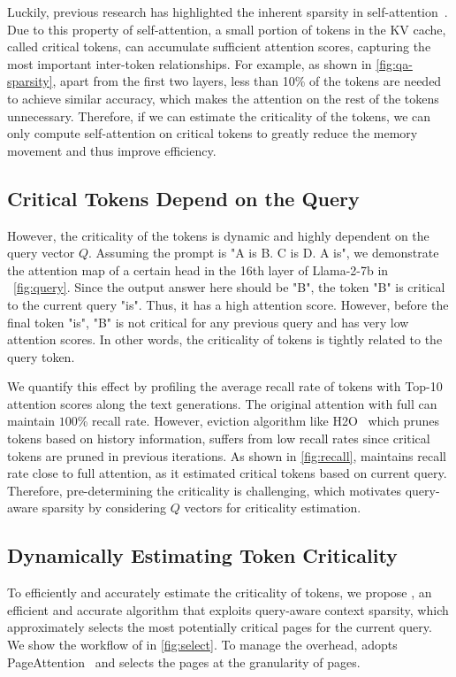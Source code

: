 Luckily, previous research has highlighted the inherent sparsity in self-attention~\cite{zhang2023h2o, ge2024model}. Due to this property of self-attention, a small portion of tokens in the KV cache, called critical tokens, can accumulate sufficient attention scores, capturing the most important inter-token relationships.
For example, as shown in \fig\ref{fig:qa-sparsity}, apart from the first two layers, less than 10\% of the tokens are needed to achieve similar accuracy, which makes the attention on the rest of the tokens unnecessary. 
Therefore, if we can estimate the criticality of the tokens, we can only compute self-attention on critical \kvc{} tokens to greatly reduce the memory movement and thus improve efficiency.

\subsection{Critical Tokens Depend on the Query}
However, the criticality of the tokens is dynamic and highly dependent on the query vector $Q$. Assuming the prompt is "A is B. C is D. A is", we demonstrate the attention map of a certain head in the 16th layer of Llama-2-7b in \fig~\ref{fig:query}. Since the output answer here should be "B", the token "B" is critical to the current query "is". Thus, it has a high attention score. However, before the final token "is", "B" is not critical for any previous query and has very low attention scores. In other words, the criticality of tokens is tightly related to the query token.

We quantify this effect by profiling the average recall rate of tokens with Top-10 attention scores along the text generations. The original attention with full \kvc{} can maintain $100$\% recall rate. However, \kvc{} eviction algorithm like H2O~\cite{zhang2023h2o} which prunes tokens based on history information, suffers from low recall rates since critical tokens are pruned in previous iterations. As shown in \fig\ref{fig:recall}, \method{} maintains recall rate close to full attention, as it estimated critical tokens based on current query. Therefore, pre-determining the criticality is challenging, which motivates query-aware sparsity by considering $Q$ vectors for criticality estimation.

\subsection{Dynamically Estimating Token Criticality}
\label{sec:methodDesp}
To efficiently and accurately estimate the criticality of \kvc{} tokens, we propose \method, an efficient and accurate algorithm that exploits query-aware context sparsity, which approximately selects the most potentially critical \kvc{} pages for the current query. We show the workflow of \method in \fig\ref{fig:select}. To manage the overhead, \method adopts PageAttention~\cite{kwon2023efficient} and selects the \kvc{} pages at the granularity of pages. 


